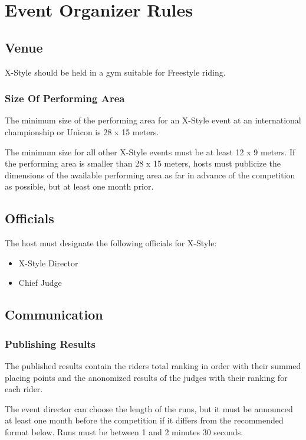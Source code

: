 \chapter{Event Organizer Rules}

\section{Venue}

X-Style should be held in a gym suitable for Freestyle riding.%

\subsection{Size Of Performing Area}

The minimum size of the performing area for an X-Style event at an international championship or Unicon is 28 x 15 meters.

The minimum size for all other X-Style events must be at least 12 x 9 meters.
If the performing area is smaller than 28 x 15 meters, hosts must publicize the dimensions of the available performing area as far in advance of the competition as possible, but at least one month prior.

\section{Officials}

The host must designate the following officials for X-Style:
\begin{itemize}
\item X-Style Director
\item Chief Judge
\end{itemize}

\section{Communication}

\subsection{Publishing Results}
The published results contain the riders total ranking in order with their summed placing points and the anonomized results of the judges with their ranking for each rider.

The event director can choose the length of the runs, but it must be announced at least one month before the competition if it differs from the recommended format below.
Runs must be between 1 and 2 minutes 30 seconds.

